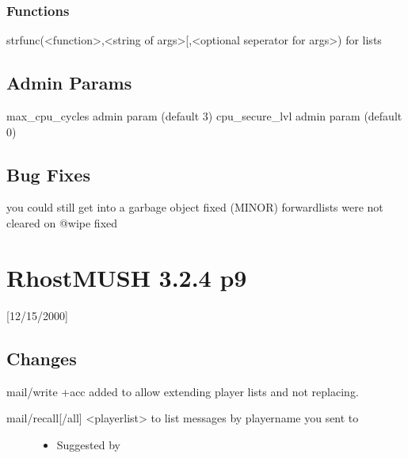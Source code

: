 \documentclass[letterpaper,10pt,english]{sphinxmanual}
\begin{document}
\subsubsection{Functions}
\label{\detokenize{changelog:id49}}
\sphinxAtStartPar
strfunc(\textless{}function\textgreater{},\textless{}string of args\textgreater{}{[},\textless{}optional seperator for args\textgreater{}) \sphinxhyphen{} for lists


\subsection{Admin Params}
\label{\detokenize{changelog:id50}}
\sphinxAtStartPar
max\_cpu\_cycles admin param (default 3)
cpu\_secure\_lvl admin param (default 0)


\subsection{Bug Fixes}
\label{\detokenize{changelog:id51}}
\sphinxAtStartPar
you could still get into a garbage object \sphinxhyphen{} fixed (MINOR)
forwardlists were not cleared on @wipe \sphinxhyphen{} fixed


\section{RhostMUSH 3.2.4 p9}
\label{\detokenize{changelog:rhostmush-3-2-4-p9}}\label{\detokenize{changelog:changelog-3-2-4p9}}
\sphinxAtStartPar
{[}12/15/2000{]}


\subsection{Changes}
\label{\detokenize{changelog:id52}}
\sphinxAtStartPar
mail/write +acc added to allow extending player lists and not replacing.
\begin{description}
\item[{mail/recall{[}/all{]} \textless{}playerlist\textgreater{} to list messages by player\sphinxhyphen{}name you sent to}] \leavevmode\begin{itemize}
\item {} 
\sphinxAtStartPar
Suggested by 

\end{itemize}

\end{description}
\end{document}
